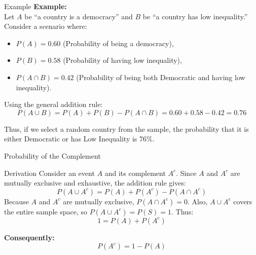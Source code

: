 \documentclass[handout]{beamer} %
\begin{document}
\begin{frame}{Example}
    \textbf{Example:}\\[0.5ex]
    Let \(A\) be “a country is a democracy” and \(B\) be “a country has low inequality.” Consider a scenario where:
    \begin{itemize}
        \item \(P(A) = 0.60\) (Probability of being a democracy),\pause
        \item \(P(B) = 0.58\) (Probability of having low inequality),\pause
        \item \(P(A \cap B) = 0.42\) (Probability of being both Democratic and having low inequality).\pause
    \end{itemize}

    Using the general addition rule:
    \[
    P(A \cup B) = P(A) + P(B) - P(A \cap B) = 0.60 + 0.58 - 0.42 = 0.76
    \]

    Thus, if we select a random country from the sample, the probability that it is either Democratic or has Low Inequality is 76\%.
\end{frame}

\begin{frame}{Probability of the Complement}

    \begin{block}{Derivation}
        Consider an event \(A\) and its complement \(A^c\). Since \(A\) and \(A^c\) are mutually exclusive and exhaustive, the addition rule gives:\pause
        \[
        P(A \cup A^c) = P(A) + P(A^c) - P(A \cap A^c)
        \]\pause
        Because \(A\) and \(A^c\) are mutually exclusive, \(P(A \cap A^c) = 0\). \pause Also, \(A \cup A^c\) covers the entire sample space, so \(P(A \cup A^c) = P(S) = 1\). \pause Thus:
        \[
        1 = P(A) + P(A^c)
        \] \pause
    \end{block}
    \pause
    \textbf{Consequently:}
    \[
    P(A^c) = 1 - P(A)
    \]
\end{frame}
\end{document}
